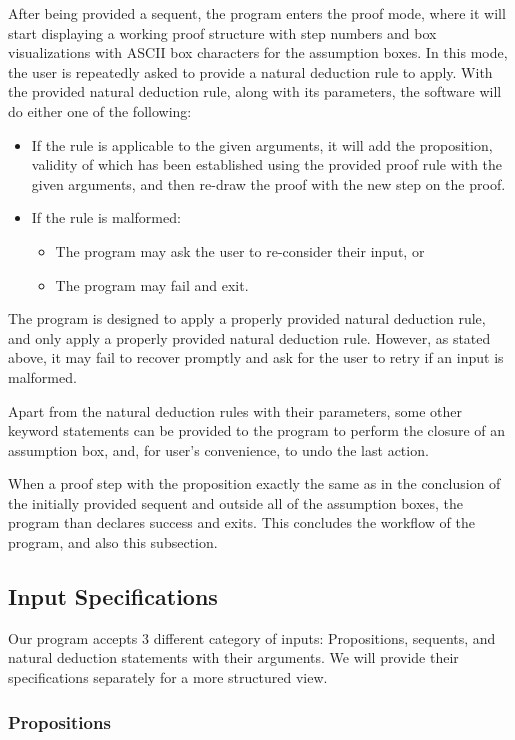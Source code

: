 \documentclass{article}
\begin{document}
After being provided a sequent, the program enters the proof mode,
where it will start displaying a working proof structure with step
numbers and box visualizations with ASCII box characters for the
assumption boxes. In this mode, the user is repeatedly asked to
provide a natural deduction rule to apply. With the provided
natural deduction rule, along with its parameters, the software
will do either one of the following:
\begin{itemize}
	\item If the rule is applicable to the given arguments, it will
		add the proposition, validity of which has been established
		using the provided proof rule with the given arguments, and
		then re-draw the proof with the new step on the proof.
	\item If the rule is malformed:
		\begin{itemize}
			\item The program may ask the user to re-consider their
				input, or
			\item The program may fail and exit.
		\end{itemize}
\end{itemize}

The program is designed to apply a properly provided natural
deduction rule, and only apply a properly provided natural deduction
rule. However, as stated above, it may fail to recover promptly
and ask for the user to retry if an input is malformed.

Apart from the natural deduction rules with their parameters,
some other keyword statements can be provided to the program
to perform the closure of an assumption box, and, for user's
convenience, to undo the last action.

When a proof step with the proposition exactly the same as in the
conclusion of the initially provided sequent and outside all of
the assumption boxes, the program than declares success and
exits. This concludes the workflow of the program, and also this
subsection.

\subsection{Input Specifications}

Our program accepts 3 different category of inputs:
Propositions, sequents, and natural deduction statements
with their arguments. We will provide their specifications
separately for a more structured view.

\subsubsection{Propositions}
\end{document}
